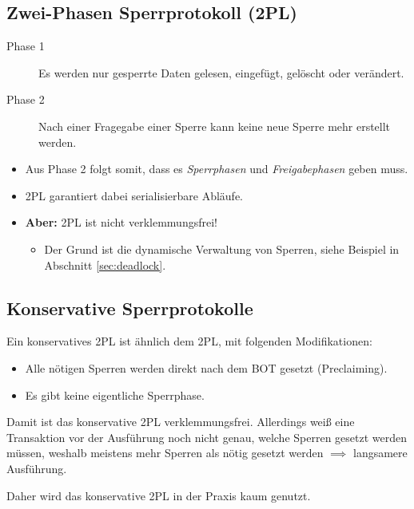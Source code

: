         \subsection{Zwei-Phasen Sperrprotokoll (2PL)} %
            \begin{description}
            	\item[Phase 1] Es werden nur gesperrte Daten gelesen, eingefügt, gelöscht oder verändert.
            	\item[Phase 2] Nach einer Fragegabe einer Sperre kann keine neue Sperre mehr erstellt werden.
            \end{description}
            \begin{itemize}
            	\item Aus Phase 2 folgt somit, dass es \textit{Sperrphasen} und \textit{Freigabephasen} geben muss.
            	\item 2PL garantiert dabei serialisierbare Abläufe.
            	\item \textbf{Aber:} 2PL ist nicht verklemmungsfrei!
            		\begin{itemize}
            			\item Der Grund ist die dynamische Verwaltung von Sperren, siehe Beispiel in Abschnitt \ref{sec:deadlock}.
            		\end{itemize}
            \end{itemize}

        \subsection{Konservative Sperrprotokolle} %
        	Ein konservatives 2PL ist ähnlich dem 2PL, mit folgenden Modifikationen:
            \begin{itemize}
            	\item Alle nötigen Sperren werden direkt nach dem BOT gesetzt (Preclaiming).
            	\item Es gibt keine eigentliche Sperrphase.
            \end{itemize}
        
        	Damit ist das konservative 2PL verklemmungsfrei. Allerdings weiß eine Transaktion vor der Ausführung noch nicht genau, welche Sperren gesetzt werden müssen, weshalb meistens mehr Sperren als nötig gesetzt werden \( \implies \) langsamere Ausführung.
        	
        	Daher wird das konservative 2PL in der Praxis kaum genutzt.

